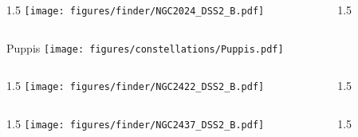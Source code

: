 \documentclass[final]{beamer}
\newlength{\colwidth}
\begin{document}

\begin{frame}[t]{}
    \begin{columns}[T]
        \begin{column}{1.5\colwidth}
            \centering
            \texttt{[image: figures/finder/NGC2024\_DSS2\_B.pdf]}
        \end{column}
        \begin{column}{1.5\colwidth}
            \Large
            
        \end{column}
    \end{columns}
    \vspace{\fill}
\end{frame}


\begin{frame}[t]{\LARGE Puppis}
    \centering
    \texttt{[image: figures/constellations/Puppis.pdf]}
\end{frame}


\begin{frame}[t]{}
    \begin{columns}[T]
        \begin{column}{1.5\colwidth}
            \centering
            \texttt{[image: figures/finder/NGC2422\_DSS2\_B.pdf]}
        \end{column}
        \begin{column}{1.5\colwidth}
            \Large
            
        \end{column}
    \end{columns}
    \vspace{\fill}
    \begin{columns}[T]
        \begin{column}{1.5\colwidth}
            \centering
            \texttt{[image: figures/finder/NGC2437\_DSS2\_B.pdf]}
        \end{column}
        \begin{column}{1.5\colwidth}
            \Large
            
        \end{column}
    \end{columns}
\end{frame}
\end{document}
